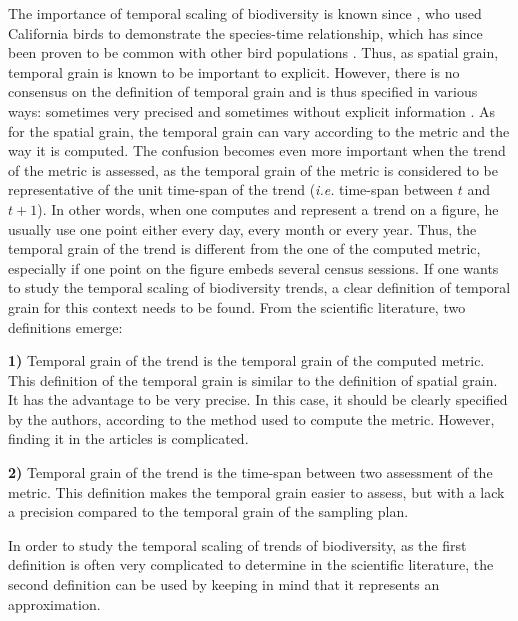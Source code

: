 \documentclass[
  12pt,
  oneside]{report}
\begin{document}
The importance of temporal scaling of biodiversity is known since \textcite{grinnell_role_1922}, who used California birds to demonstrate the species-time relationship, which has since been proven to be common with other bird populations \autocite{white_two-phase_2004}. Thus, as spatial grain, temporal grain is known to be important to explicit. However, there is no consensus on the definition of temporal grain and is thus specified in various ways: sometimes very precised \autocite[\emph{e.g.} time of each census point, as in][]{schipper_contrasting_2016} and sometimes without explicit information \autocite[\emph{e.g.}][\emph{`The sites are visited twice a year (April to early May and late May to June), during which volunteers walk two parallel 1-km-long transect lines {[}\ldots{]}'}]{harrison_assessing_2014}. As for the spatial grain, the temporal grain can vary according to the metric and the way it is computed. The confusion becomes even more important when the trend of the metric is assessed, as the temporal grain of the metric is considered to be representative of the unit time-span of the trend (\emph{i.e.} time-span between \(t\) and \(t+1\)). In other words, when one computes and represent a trend on a figure, he usually use one point either every day, every month or every year. Thus, the temporal grain of the trend is different from the one of the computed metric, especially if one point on the figure embeds several census sessions. If one wants to study the temporal scaling of biodiversity trends, a clear definition of temporal grain for this context needs to be found. From the scientific literature, two definitions emerge:

\textbf{1)} Temporal grain of the trend is the temporal grain of the computed metric. This definition of the temporal grain is similar to the definition of spatial grain. It has the advantage to be very precise. In this case, it should be clearly specified by the authors, according to the method used to compute the metric. However, finding it in the articles is complicated.

\textbf{2)} Temporal grain of the trend is the time-span between two assessment of the metric. This definition makes the temporal grain easier to assess, but with a lack a precision compared to the temporal grain of the sampling plan.

In order to study the temporal scaling of trends of biodiversity, as the first definition is often very complicated to determine in the scientific literature, the second definition can be used by keeping in mind that it represents an approximation.
\end{document}
